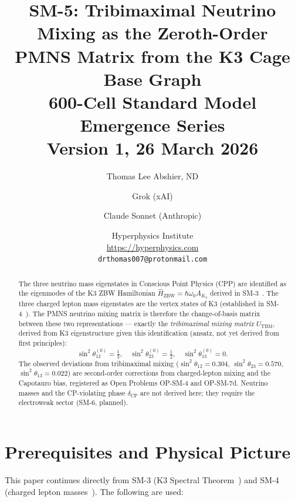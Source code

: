 \documentclass[11pt]{article}
\title{\textbf{SM-5: Tribimaximal Neutrino Mixing as the Zeroth-Order\\
PMNS Matrix from the K3 Cage Base Graph}\\[6pt]
{\large 600-Cell Standard Model Emergence Series}\\[4pt]
{\normalsize Version 1, 26 March 2026}}
\author{Thomas Lee Abshier, ND \and Grok (xAI) \and Claude Sonnet (Anthropic)}
\date{\normalsize Hyperphysics Institute\\
\url{https://hyperphysics.com}\\
\texttt{drthomas007@protonmail.com}}
\newcommand{\ZBW}{\mathrm{ZBW}}
\newcommand{\CP}{\mathrm{CP}}
\newcommand{\TBM}{\mathrm{TBM}}
\begin{document}
\maketitle

\begin{abstract}
The three neutrino mass eigenstates in Conscious Point Physics (CPP)
are identified as the eigenmodes of the K3 ZBW Hamiltonian
$\hat{H}_\ZBW = \hbar\omega_0 A_{K_3}$ derived in SM-3~\cite{abshier_sm3}.
The three charged lepton mass eigenstates are the vertex states of K3
(established in SM-4~\cite{abshier_sm4}).  The PMNS neutrino mixing matrix
is therefore the change-of-basis matrix between these two representations
--- exactly the \emph{tribimaximal mixing matrix} $U_\TBM$, derived from
K3 eigenstructure given this identification (ansatz, not yet derived from
first principles):
\[
\sin^2\theta_{12}^{(0)} = \tfrac{1}{3},\quad
\sin^2\theta_{23}^{(0)} = \tfrac{1}{2},\quad
\sin^2\theta_{13}^{(0)} = 0.
\]
The observed deviations from tribimaximal mixing
($\sin^2\theta_{12} = 0.304$, $\sin^2\theta_{23} = 0.570$,
$\sin^2\theta_{13} = 0.022$) are second-order corrections from
charged-lepton mixing and the Capotauro bias, registered as
Open Problems OP-SM-4 and OP-SM-7d.
Neutrino masses and the CP-violating phase $\delta_\CP$ are not
derived here; they require the electroweak sector (SM-6, planned).
\end{abstract}

\raggedright

\section{Prerequisites and Physical Picture}

This paper continues directly from SM-3 (K3 Spectral Theorem~\cite{abshier_sm3})
and SM-4 (charged lepton masses~\cite{abshier_sm4}).
The following are used:
\end{document}
